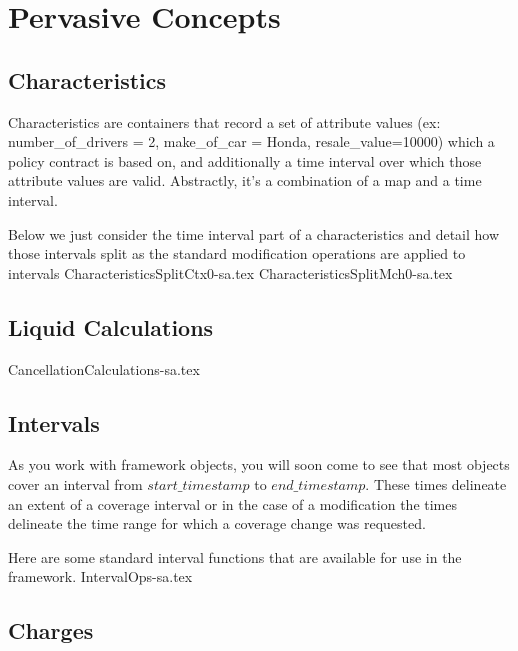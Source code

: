 \motto{}
\chapter{Pervasive Concepts}
\label{intro03} %

\abstract{
}

\section{Characteristics}
\label{sec:03:1}

Characteristics are containers that record a set of attribute values
(ex: number\_of\_drivers = 2, make\_of\_car = Honda, resale\_value=10000)
which a policy contract is based on, and additionally a time interval over which
those attribute values are valid. Abstractly, it's a combination of a map and a time
interval. 

Below we just consider the time interval part of a characteristics and detail
how those intervals split as the standard modification operations are applied
to intervals
{CharacteristicsSplitCtx0-sa.tex}
{CharacteristicsSplitMch0-sa.tex}

\section{Liquid Calculations}
\label{sec:03:2}

{CancellationCalculations-sa.tex}

\section{Intervals}
As you work with framework objects, you will soon come to see that most objects cover
an interval from $start\_timestamp$ to $end\_timestamp$. These times delineate an extent of
a coverage interval or in the case of a modification the times delineate the time range for
which a coverage change was requested.

Here are some standard interval functions that are available for use in the framework.
{IntervalOps-sa.tex}

\section{Charges}
\label{sec:03:3}

